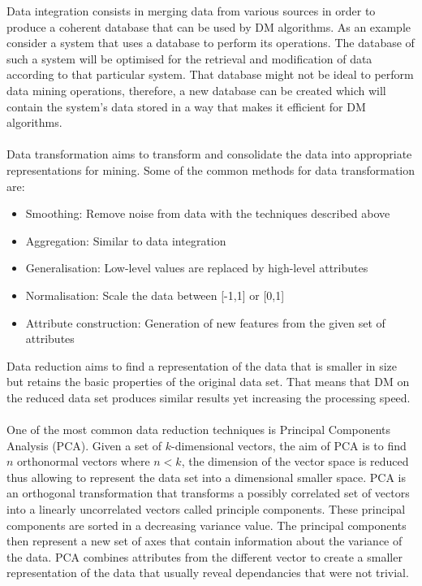 \documentclass[11pt, oneside]{article}   	%
\begin{document}
Data integration consists in merging data from various sources in order to produce a coherent database that can be used by DM algorithms. As an example consider a system that uses a database to perform its operations. The database of such a system will be optimised for the retrieval and modification of data according to that particular system. That database might not be ideal to perform data mining operations, therefore, a new database can be created which will contain the system's data stored in a way that makes it efficient for DM algorithms.\\\\
Data transformation aims to transform and consolidate the data into appropriate representations for mining. Some of the common methods for data transformation are:
\begin{itemize}
	\item Smoothing: Remove noise from data with the techniques described above
	\item Aggregation: Similar to data integration
	\item Generalisation: Low-level values are replaced by high-level attributes
	\item Normalisation: Scale the data between [-1,1] or [0,1]
	\item Attribute construction: Generation of new features from the given set of attributes
\end{itemize}
Data reduction aims to find a representation of the data that is smaller in size but retains the basic properties of the original data set. That means that DM on the reduced data set produces similar results yet increasing the processing speed.\\\\ 
One of the most common data reduction techniques is Principal Components Analysis (PCA). Given a set of $k$-dimensional vectors, the aim of PCA is to find $n$ orthonormal vectors where $n<k$, the dimension of the vector space is reduced thus allowing to represent the data set into a dimensional smaller space. PCA is an orthogonal transformation that transforms a possibly correlated set of vectors into a linearly uncorrelated vectors called principle components. These principal components are sorted in a decreasing variance value. The principal components then represent a new set of axes that contain information about the variance of the data. PCA combines attributes from the different vector to create a smaller representation of the data that usually reveal dependancies that were not trivial.
\end{document}
